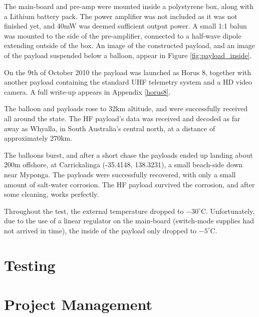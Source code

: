 \documentclass[a4paper,12pt]{article}
\begin{document}
The main-board and pre-amp were mounted inside a polystyrene box, along with a Lithium battery pack. The power amplifier was not included as it was not finished yet, and 40mW was deemed sufficient output power.  A small 1:1 balun was mounted to the side of the pre-amplifier, connected to a half-wave dipole extending outside of the box. An image of the constructed payload, and an image of the payload suspended below a balloon, appear in Figure \ref{fig:payload_inside}.

On the 9th of October 2010 the payload was launched as Horus 8, together with another payload containing the standard UHF telemetry system and a HD video camera. A full write-up appears in Appendix \ref{horus8}. 

The balloon and payloads rose to 32km altitude, and were successfully received all around the state. The HF payload's data was received and decoded as far away as Whyalla, in South Australia's central north, at a distance of approximately 270km. 

The balloons burst, and after a short chase the payloads ended up landing about 200m offshore, at Carrickalinga (-35.4148, 138.3231), a small beach-side down near Myponga. The payloads were successfully recovered, with only a small amount of salt-water corrosion. The HF payload survived the corrosion, and after some cleaning, works perfectly.

Throughout the test, the external temperature dropped to $-30^\circ$C. Unfortunately, due to the use of a linear regulator on the main-board (switch-mode supplies had not arrived in time), the inside of the payload only dropped to $-5^\circ$C.

\section{Testing}

\section{Project Management}
\end{document}
